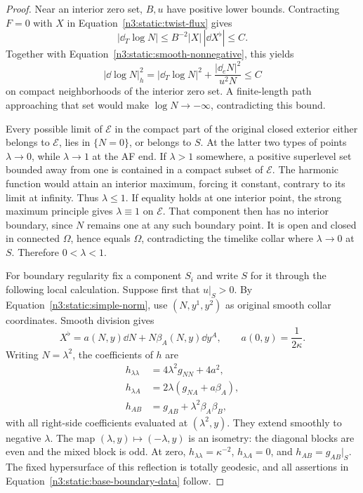 \begin{proof}
Near an interior zero set, \(B,u\) have positive lower bounds.
Contracting \(F=0\) with \(X\) in
Equation~\eqref{n3:static:twist-flux} gives
\[
|\dd_T\log N|\leq B^{-2}|X|\,|\dd X^\flat|\leq C.
\]
Together with Equation~\eqref{n3:static:smooth-nonnegative}, this yields
\begin{equation}
\label{n3:static:complete-log-bound}
|\dd\log N|_h^2
=|\dd_T\log N|^2+\frac{|\dd_eN|^2}{u^2N}\leq C
\end{equation}
on compact neighborhoods of the interior zero set.
A finite-length path approaching that set would make
\(\log N\to-\infty\), contradicting this bound.

Every possible limit of \(\mathcal E\) in the compact part of the
original closed exterior either belongs to \(\mathcal E\), lies in
\(\{N=0\}\), or belongs to \(S\). At the latter two types of points
\(\lambda\to0\), while \(\lambda\to1\) at the AF end.
If \(\lambda>1\) somewhere, a positive superlevel set bounded away
from one is contained in a compact subset of \(\mathcal E\).
The harmonic function would attain an interior maximum, forcing it
constant, contrary to its limit at infinity.
Thus \(\lambda\leq1\).
If equality holds at one interior point, the strong maximum principle
gives \(\lambda\equiv1\) on \(\mathcal E\).
That component then has no interior boundary, since \(N\) remains one
at any such boundary point. It is open and closed in connected
\(\Omega\), hence equals \(\Omega\), contradicting the timelike collar
where \(\lambda\to0\) at \(S\).
Therefore \(0<\lambda<1\).

For boundary regularity fix a component $S_i$ and write $S$ for it
through the following local calculation. Suppose first that \(u|_S>0\).
By Equation~\eqref{n3:static:simple-norm}, use \((N,y^1,y^2)\)
as original smooth collar coordinates. Smooth division gives
\[
X^\flat=a(N,y)\dd N+N\beta_A(N,y)\dd y^A,\qquad
a(0,y)=\frac1{2\kappa}.
\]
Writing \(N=\lambda^2\), the coefficients of \(h\) are
\begin{equation}
\label{n3:static:even-base}
\begin{aligned}
h_{\lambda\lambda}&=4\lambda^2g_{NN}+4a^2,\\
h_{\lambda A}&=2\lambda(g_{NA}+a\beta_A),\\
h_{AB}&=g_{AB}+\lambda^2\beta_A\beta_B,
\end{aligned}
\end{equation}
with all right-side coefficients evaluated at \((\lambda^2,y)\).
They extend smoothly to negative \(\lambda\).
The map \((\lambda,y)\mapsto(-\lambda,y)\) is an isometry:
the diagonal blocks are even and the mixed block is odd.
At zero, \(h_{\lambda\lambda}=\kappa^{-2}\),
\(h_{\lambda A}=0\), and \(h_{AB}=g_{AB}|_S\).
The fixed hypersurface of this reflection is totally geodesic,
and all assertions in Equation~\eqref{n3:static:base-boundary-data}
follow.


\end{proof}
